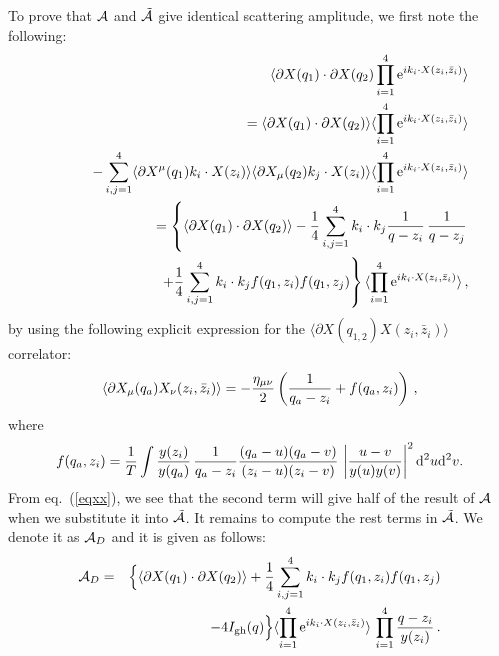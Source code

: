 \documentclass[a4paper,12pt]{article}
\begin{document}
To prove that ${\cal A}$ and $\tilde{\cal A}$ give identical
scattering amplitude, we first note the following:
\begin{eqnarray}
   & & \langle \partial X(q_1) \cdot \partial X(q_2)
\prod_{i=1}^4 \hbox{e}^{i k_i \cdot X(z_i, \bar z_i)} \rangle
\nonumber \\
&  &  \qquad =  \langle \partial X(q_1) \cdot \partial X(q_2)
\rangle \langle  \prod_{i=1}^4 \hbox{e}^{i k_i \cdot X(z_i, \bar
z_i)} \rangle  \nonumber \\
& & \qquad - \sum_{i,j=1}^4 \langle \partial X^\mu(q_1) k_i\cdot
X(z_i) \rangle \langle \partial X_\mu(q_2) k_j\cdot X(z_i) \rangle
\langle \prod_{i=1}^4 \hbox{e}^{i k_i
\cdot X(z_i, \bar z_i)} \rangle \nonumber \\
&   & \qquad = \left\{ \langle \partial X(q_1) \cdot \partial
X(q_2) \rangle-  {1\over 4}  \sum_{i,j=1}^4k_i\cdot k_j
  {1\over q -z_i}\, {1\over q-z_j} \right.
  \nonumber \\
  & & \hskip  2cm \left.   + {1\over 4}  \sum_{i,j=1}^4 k_i \cdot k_j
f(q_1,z_i)f(q_1,z_j)  \right\} \langle \prod_{i=1}^4 \hbox{e}^{i
k_i \cdot X(z_i, \bar z_i)} \rangle \, , \label{eqxx}
\end{eqnarray}
by using the following explicit expression for the $\langle
\partial X(q_{1,2}) X(z_i,\bar z_i)\rangle$ correlator:
\begin{equation}
\langle \partial X_\mu(q_a) X_\nu(z_i,\bar z_i)\rangle =
-{\eta_{\mu\nu}\over 2} \left( { 1\over q_a - z_i } +
f(q_a,z_i)\right) \, , \label{eqpxx}
\end{equation}
where
\begin{equation} f(q_a,z_i)   =  { 1\over   T} \int  {
y(z_i)\over y(q_a) } \, { 1\over q_a - z_i}    { (q_a-u)(q_a-v)
\over (z_i-u)(z_i-v) } \, \left| u-v \over y(u)y(v) \right|^2 {\rm
d}^2 u{\rm d}^2 v .
\end{equation}
From eq.~(\ref{eqxx}), we see that the second term will give half
of the result of ${\cal A}$ when we substitute it into
$\tilde{\cal A}$. It remains to compute the rest terms in
$\tilde{\cal A}$. We denote it as ${\cal A}_D$ and it is given as
follows:
\begin{eqnarray}
{\cal A}_D& = & \Big\{ \langle \partial X(q_1) \cdot \partial
X(q_2) \rangle +  {1\over 4} \sum_{i,j=1}^4 k_i \cdot k_j
f(q_1,z_i)f(q_1,z_j) \nonumber \\
& & \qquad - 4 I_{\rm gh}(q) \Big\} \langle \prod_{i=1}^4
\hbox{e}^{i k_i \cdot X(z_i, \bar z_i)} \rangle
 \, \prod_{i=1}^4 { q - z_i \over y(z_i)}\, .
\end{eqnarray}
\end{document}

